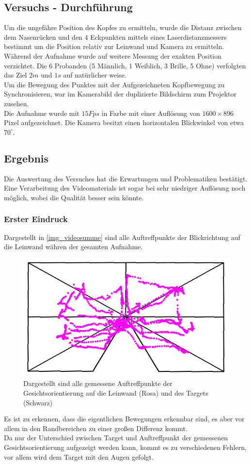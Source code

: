\subsection{Versuchs - Durchführung}
Um die ungefähre Position des Kopfes zu ermitteln, wurde die Distanz zwischen dem Nasenrücken und den 4 Eckpunkten mittels eines Laserdistanzmessers bestimmt um die Position relativ zur Leinwand und Kamera zu ermitteln.\\
Während der Aufnahme wurde auf weitere Messung der exakten Position verzichtet.
Die 6 Probanden (5 Männlich, 1 Weiblich, 3 Brille, 5 Ohne) verfolgten das Ziel $2m$ und $1s$ auf natürlicher weise.\\
Um die Bewegung des Punktes mit der Aufgezeichneten Kopfbewegung zu Synchronisieren, war im Kamerabild der duplizierte Bildschirm zum Projektor zusehen.\\
Die Aufnahme wurde mit $15Fps$ in Farbe mit einer Auflösung von $1600\times 896$ Pixel aufgezeichnet. Die Kamera besitzt einen horizontalen Blickwinkel von etwa $70^\circ$.
\subsection{Ergebnis}
Die Auswertung des Versuches hat die Erwartungen und Problematiken bestätigt. Eine Verarbeitung des Videomaterials ist sogar bei sehr niedriger Auflösung noch möglich, wobei die Qualität besser sein könnte.
\subsubsection{Erster Eindruck}
Dargestellt in \autoref{img_videosumme} sind alle Auftreffpunkte der Blickrichtung auf die Leinwand währen der gesamten Aufnahme.\\
\begin{figure}
	\centering
	\includegraphics[width=0.7\linewidth]{OpenFace_Img/VideoSumme}
	\caption{Dargestellt sind alle gemessene Auftreffpunkte der Gesichtsorientierung auf die Leinwand (Rosa) und des Targets (Schwarz)}
	\label{img_videosumme}
\end{figure}
Es ist zu erkennen, dass die eigentlichen Bewegungen erkennbar sind, es aber vor allem in den Randbereichen zu einer großen Differenz kommt.\\
Da nur der Unterschied zwischen Target und Auftreffpunkt der gemessenen Gesichtsorientierung aufgezeigt werden kann, kommt es zu verschiedenen Fehlern, vor allem wird dem Target mit den Augen gefolgt.
